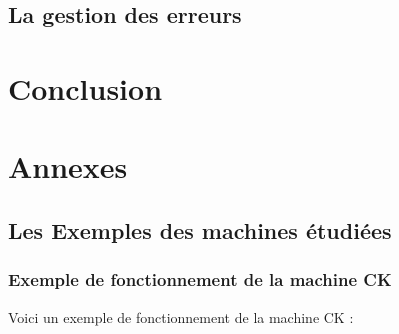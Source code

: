 \documentclass[10pt,a4paper]{article}
\begin{document}
	
	
			\subsection{La gestion des erreurs}
	
	\section{Conclusion}
		
		\newpage
		
		
		
	\section{Annexes}
		
		\subsection{Les Exemples des machines étudiées}
		
			\subsubsection{Exemple de fonctionnement de la machine CK}\label{CK}
			
				Voici un exemple de fonctionnement de la machine CK :
		
\end{document}
